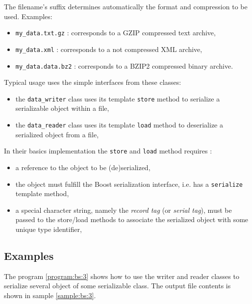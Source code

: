 \documentclass[a4paper,12pt]{article}
\newcommand{\pn}{\par\noindent}
\begin{document}
\pn  The filename's  suffix  determines automatically  the format  and
compression to be used. Examples:

\begin{itemize}
\item \texttt{my\_data.txt.gz} : corresponds to a GZIP compressed text
  archive,
\item  \texttt{my\_data.xml} :  corresponds  to a  not compressed  XML
  archive,
\item \texttt{my\_data.data.bz2}  : corresponds to  a BZIP2 compressed
  binary archive.
\end{itemize}


\pn Typical usage uses the simple interfaces from these classes:

\begin{itemize}

\item the \texttt{data\_writer} class uses its template \texttt{store}
  method to serialize a serializable object within a file,

\item the \texttt{data\_reader} class uses its template \texttt{load}
  method to deserialize a serialized object from a file,

\end{itemize}

\pn In their basics implementation the \texttt{store} and \texttt{load}
method requires :

\begin{itemize}

\item a reference to the object to be (de)serialized,

\item the object must fulfill the Boost serialization interface, i.e.
has a \texttt{serialize} template method,

\item  a special character  string, namely  the \emph{record  tag} (or
  \emph{serial  tag}), must  be passed  to the  store/load  methods to
  associate the serialized object with some unique type identifier,

\end{itemize}

\subsection{Examples}

\pn The  program \ref{program:bs:3}  shows how to  use the  writer and
reader  classes  to  serialize  several object  of  some  serializable
class. The output file contents is shown in sample \ref{sample:bs:3}.
\end{document}
